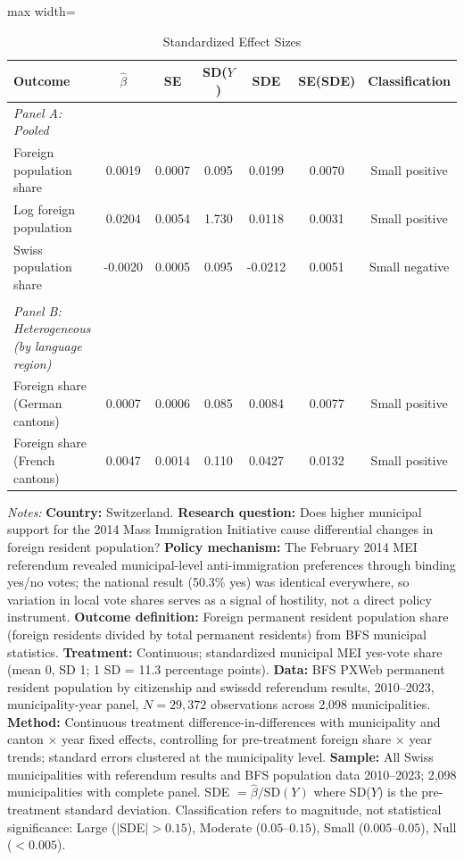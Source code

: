 \begin{table}[htbp]
\centering
\caption{Standardized Effect Sizes}
\label{tab:sde}
\begin{adjustbox}{max width=\textwidth}
\begin{tabular}{lcccccc}
\hline\hline
Outcome & $\hat{\beta}$ & SE & SD($Y$) & SDE & SE(SDE) & Classification \\
\hline
\emph{Panel A: Pooled} & & & & & & \\
Foreign population share & 0.0019 & 0.0007 & 0.095 & 0.0199 & 0.0070 & Small positive \\
Log foreign population & 0.0204 & 0.0054 & 1.730 & 0.0118 & 0.0031 & Small positive \\
Swiss population share & -0.0020 & 0.0005 & 0.095 & -0.0212 & 0.0051 & Small negative \\
 \\
\emph{Panel B: Heterogeneous (by language region)} & & & & & & \\
Foreign share (German cantons) & 0.0007 & 0.0006 & 0.085 & 0.0084 & 0.0077 & Small positive \\
Foreign share (French cantons) & 0.0047 & 0.0014 & 0.110 & 0.0427 & 0.0132 & Small positive \\
\hline\hline
\end{tabular}
\end{adjustbox}
\par\vspace{0.3em}
\parbox{\textwidth}{\footnotesize \textit{Notes:} \textbf{Country:} Switzerland. \textbf{Research question:} Does higher municipal support for the 2014 Mass Immigration Initiative cause differential changes in foreign resident population? \textbf{Policy mechanism:} The February 2014 MEI referendum revealed municipal-level anti-immigration preferences through binding yes/no votes; the national result (50.3\% yes) was identical everywhere, so variation in local vote shares serves as a signal of hostility, not a direct policy instrument. \textbf{Outcome definition:} Foreign permanent resident population share (foreign residents divided by total permanent residents) from BFS municipal statistics. \textbf{Treatment:} Continuous; standardized municipal MEI yes-vote share (mean 0, SD 1; 1 SD = 11.3 percentage points). \textbf{Data:} BFS PXWeb permanent resident population by citizenship and swissdd referendum results, 2010--2023, municipality-year panel, $N = 29{,}372$ observations across 2,098 municipalities. \textbf{Method:} Continuous treatment difference-in-differences with municipality and canton $\times$ year fixed effects, controlling for pre-treatment foreign share $\times$ year trends; standard errors clustered at the municipality level. \textbf{Sample:} All Swiss municipalities with referendum results and BFS population data 2010--2023; 2,098 municipalities with complete panel. SDE $= \hat{\beta} / \text{SD}(Y)$ where SD($Y$) is the pre-treatment standard deviation. Classification refers to magnitude, not statistical significance: Large ($|$SDE$| > 0.15$), Moderate ($0.05$--$0.15$), Small ($0.005$--$0.05$), Null ($< 0.005$).}
\end{table}
